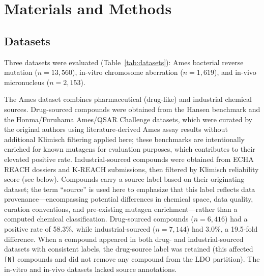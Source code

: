 \section{Materials and Methods}

\subsection{Datasets}

Three datasets were evaluated (Table~\ref{tab:datasets}): Ames bacterial reverse mutation 
($n = 13{,}560$), in-vitro chromosome aberration ($n = 1{,}619$), and in-vivo micronucleus 
($n = 2{,}153$).

The Ames dataset combines pharmaceutical (drug-like) and industrial chemical sources. 
Drug-sourced compounds were obtained from the Hansen benchmark\cite{Hansen_2009} and the 
Honma/Furuhama Ames/QSAR Challenge datasets,\cite{Honma_2019,Furuhama_2023} which were 
curated by the original authors using literature-derived Ames assay results without 
additional Klimisch filtering applied here; these benchmarks are intentionally enriched for 
known mutagens for evaluation purposes, which contributes to their elevated positive rate. 
Industrial-sourced compounds were obtained from ECHA REACH dossiers and K-REACH 
submissions, then filtered by Klimisch reliability score (see below). Compounds carry a 
source label based on their originating dataset; the term ``source'' is used here to 
emphasize that this label reflects data provenance---encompassing potential differences in 
chemical space, data quality, curation conventions, and pre-existing mutagen 
enrichment---rather than a computed chemical classification. Drug-sourced compounds 
($n = 6{,}416$) had a positive rate of 58.3\%, while industrial-sourced ($n = 7{,}144$) had 
3.0\%, a 19.5-fold difference. When a compound appeared in both drug- and industrial-sourced 
datasets with consistent labels, the drug-source label was retained (this affected 
\texttt{[N]} compounds and did not remove any compound from the LDO partition). The in-vitro 
and in-vivo datasets lacked source annotations.



